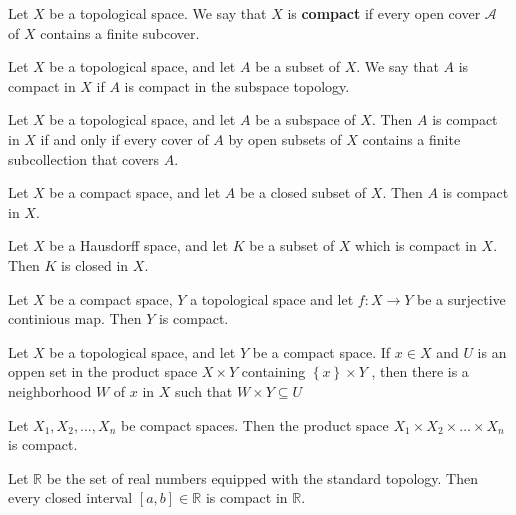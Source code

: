 \documentclass{article}
\theoremstyle{remark}
\begin{document}
\begin{definition}
    Let $X$ be a topological space. We say that $X$ is \textbf{compact} if every open cover $ \mathscr{A} $ of $X$
    contains a finite subcover.

\end{definition}

\begin{definition}
    Let $X$ be a topological space, and let $A$ be a subset of $X$. We say that $A$ is compact in $X$ if $A $ is compact
    in the subspace topology.
\end{definition}


\begin{lemma}
    Let $X$ be a topological space, and let $A$ be a subspace of $X$.  Then $A$ is compact in $X$ if and only if every
    cover of $A$ by open subsets of $X$ contains a finite subcollection that covers $A$.
\end{lemma}

\begin{theorem}
    Let $X$ be a compact space, and let $A$ be a closed subset of $X$.  Then $A $ is compact in $X$.
\end{theorem}

\begin{theorem}
Let $X$ be a Hausdorff space,  and let $K $ be a subset of $X$ which is compact in $X$. Then $K$ is closed in $X$.
\end{theorem}

\begin{theorem}
Let $X$ be a compact space, $Y$ a topological space and let $f: X \to Y$ be a surjective continious map. Then $Y$ is
compact.
\end{theorem}

\begin{lemma}
Let $X$ be a topological space, and let $Y$ be a compact space.  If $x \in  X $ and $U$ is an oppen set in the product
space $X \times Y$ containing $\left\{ x \right\} \times Y$ , then there is a neighborhood $W$ of $x$ in $X$ such that
$W \times  Y \subseteq U$
\end{lemma}


\begin{theorem}
Let $X_{1} , X_{2}, \ldots , X_{n}$ be compact spaces. Then the product space $X_{1} \times  X_{2} \times \ldots\times
X_{n}$ is compact.
\end{theorem}


\begin{theorem}
Let $\mathbb{R} $ be the set of real numbers equipped with the standard topology. Then every closed interval $\left[ a,b
\right] \in \mathbb{R} $ is compact in $ \mathbb{R} $.
\end{theorem}
\end{document}
